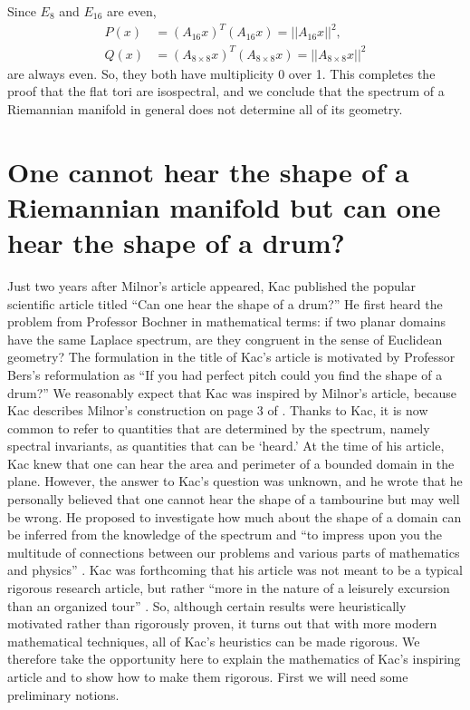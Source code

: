 \documentclass{amsart}
\theoremstyle{definition}
\begin{document}
Since $E_8$ and $E_{16}$ are even, 
\begin{align*}
    P(x) &= (A_{16}x)^T(A_{16}x) = ||A_{16}x||^2, \\
    Q(x) &= (A_{8\times 8}x)^T(A_{8\times 8}x) = ||A_{8 \times 8}x||^2
\end{align*} 
are always even. So, they both have multiplicity 0 over 1. This completes the proof that the flat tori are isospectral, and we conclude that the spectrum of a Riemannian manifold in general does not determine all of its geometry.



\section{One cannot hear the shape of a Riemannian manifold but can one hear the shape of a drum?}  \label{sec:kac}

Just two years after Milnor's article appeared, Kac published the popular scientific article \cite{kac1966can} titled ``Can one hear the shape of a drum?''  He first heard the problem from Professor Bochner in mathematical terms:  if two planar domains have the same Laplace spectrum, are they congruent in the sense of Euclidean geometry?  The formulation in the title of Kac's article is motivated by Professor Bers's reformulation as ``If you had perfect pitch could you find the shape of a drum?''  We reasonably expect that Kac was inspired by Milnor's article, because Kac describes Milnor's construction on page 3 of \cite{kac1966can}.  Thanks to Kac, it is now common to refer to quantities that are determined by the spectrum, namely spectral invariants, as quantities that can be `heard.'  At the time of his article, Kac knew that one can hear the area and perimeter of a bounded domain in the plane.  However, the answer to Kac's question was unknown, and he wrote that he personally believed that one cannot hear the shape of a tambourine but may well be wrong.  He proposed to investigate how much about the shape of a domain can be inferred from the knowledge of the spectrum and ``to impress upon you the multitude of connections between our problems and various parts of mathematics and physics'' \cite[p. 3]{kac1966can}. Kac was forthcoming that his article was not meant to be a typical rigorous research article, but rather ``more in the nature of a leisurely excursion than an organized tour'' \cite[p.1]{kac1966can}. So, although certain results were heuristically motivated rather than rigorously proven, it turns out that with more modern mathematical techniques, all of Kac's heuristics can be made rigorous.  We therefore take the opportunity here to explain the mathematics of Kac's inspiring article and to show how to make them rigorous.  
First we will need some preliminary notions. 
\end{document}
